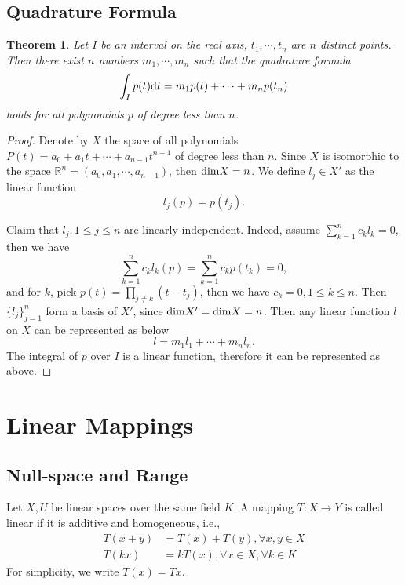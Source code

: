 \documentclass[11pt]{book}
\newtheorem{theorem}{Theorem}[section]
\theoremstyle{definition}
\numberwithin{equation}{chapter}
\begin{document}
\medskip

\section{Quadrature Formula}
\begin{theorem}
Let $I$ be an interval on the real axis, $t_1, \cdots, t_n$ are $n$ distinct points. Then there exist $n$ numbers $m_1,\cdots,m_n$ such that the quadrature formula
\begin{align*}
    \int_I p(t) {\rm d}t = m_1 p(t) + \cdots + m_n p(t_n)
\end{align*}
holds for all polynomials $p$ of degree less than $n$.
\end{theorem}
\begin{proof}
Denote by $X$ the space of all polynomials $P(t) = a_0 + a_1 t +\cdots+ a_{n-1}t^{n-1}$ of degree less than $n$. Since $X$ is isomorphic to the space $\mathbb{R}^n = (a_0,a_1,\cdots,a_{n-1})$, then ${\rm dim}X = n$. We define $l_j\in X'$ as the linear function 
$$l_j(p) = p(t_j).$$

Claim that $l_j, 1\leq j \leq n$ are linearly independent. Indeed, assume $\sum^n_{k=1}c_k l_k = 0$, then we have 
$$\sum^n_{k=1}c_k l_k(p) = \sum^n_{k=1}c_k p(t_k) = 0,$$
and for $k$, pick $p(t) = \prod_{j\neq k}(t - t_j)$, then we have $c_k = 0, 1\leq k\leq n$. Then $\{l_j\}^n_{j=1}$ form a basis of $X'$, since ${\rm dim}X' = {\rm dim}X = n$. Then any linear function $l$ on $X$ can be represented as below
$$l = m_1 l_1 + \cdots + m_n l_n.$$
The integral of $p$ over $I$ is a linear function, therefore it can be represented as above.
\end{proof}


\medskip

\chapter{Linear Mappings}
\section{Null-space and Range}

Let $X,U$ be linear spaces over the same field $K$. A mapping $T:X\to Y$ is called linear if it is additive and homogeneous, i.e.,
\begin{align*}
    T(x+y) &= T(x)+T(y), \forall x,y \in X\\
    T(k x) &= k T(x), \forall x\in X, \forall k\in K
\end{align*}
For simplicity, we write $T(x) = T x$.
\end{document}
